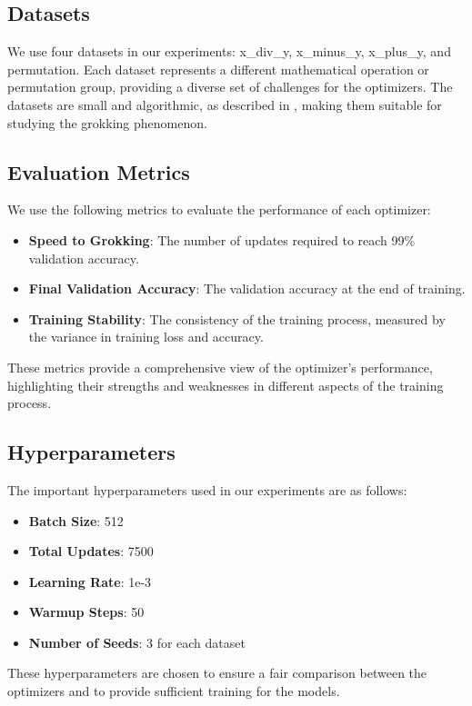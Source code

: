 \documentclass{article} %
\begin{document}
\subsection{Datasets}
We use four datasets in our experiments: x\_div\_y, x\_minus\_y, x\_plus\_y, and permutation. Each dataset represents a different mathematical operation or permutation group, providing a diverse set of challenges for the optimizers. The datasets are small and algorithmic, as described in \citet{power2022grokking}, making them suitable for studying the grokking phenomenon.

\subsection{Evaluation Metrics}
We use the following metrics to evaluate the performance of each optimizer:
\begin{itemize}
    \item \textbf{Speed to Grokking}: The number of updates required to reach 99\% validation accuracy.
    \item \textbf{Final Validation Accuracy}: The validation accuracy at the end of training.
    \item \textbf{Training Stability}: The consistency of the training process, measured by the variance in training loss and accuracy.
\end{itemize}
These metrics provide a comprehensive view of the optimizer's performance, highlighting their strengths and weaknesses in different aspects of the training process.

\subsection{Hyperparameters}
The important hyperparameters used in our experiments are as follows:
\begin{itemize}
    \item \textbf{Batch Size}: 512
    \item \textbf{Total Updates}: 7500
    \item \textbf{Learning Rate}: 1e-3
    \item \textbf{Warmup Steps}: 50
    \item \textbf{Number of Seeds}: 3 for each dataset
\end{itemize}
These hyperparameters are chosen to ensure a fair comparison between the optimizers and to provide sufficient training for the models.
\end{document}
